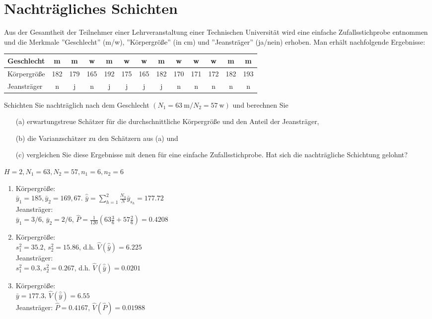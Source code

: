 \documentclass{article}
\begin{document}
\section{Nachträgliches Schichten}
Aus der Gesamtheit der Teilnehmer einer Lehrveranstaltung einer Technischen Universität
wird eine einfache Zufallsstichprobe entnommen und die Merkmale ''Geschlecht'' (m/w),
''Körpergröße'' (in cm) und ''Jeansträger'' (ja/nein) erhoben.
Man erhält nachfolgende Ergebnisse:
\begin{center} \small
	\begin{tabular}{|l|cccccccccccc|} \hline
		Geschlecht   &  m  &  m  &  w  &  m  &  w  &  w  &  m  &  w  &  w  &  w  &  m  &  m  \\ \hline
		Körpergröße  & 182 & 179 & 165 & 192 & 175 & 165 & 182 & 170 & 171 & 172 & 182 & 193 \\
		Jeansträger  &  n  &  j  &  n  &  j  &  j  &  j  &  j  &  n  &  n  &  n  &  n  &  n  \\ \hline
	\end{tabular}
\end{center}
Schichten Sie nachträglich nach dem Geschlecht $(N_1 = 63 \ \text{m} / N_2 = 57 \ \text{w})$
und berechnen Sie
\begin{enumerate}
	\item[(a)] erwartungstreue Schätzer für die durchschnittliche Körpergröße und den Anteil der Jeansträger,
	\item[(b)] die Varianzschätzer zu den Schätzern aus (a) und
	\item[(c)] vergleichen Sie diese Ergebnisse mit denen für eine einfache Zufallsstichprobe. Hat sich die nachträgliche Schichtung gelohnt?
\end{enumerate}
\begin{solution}
$H=2, N_1=63, N_2 = 57, n_1 = 6, n_2 = 6$
\begin{enumerate}
	\item Körpergröße:\\ $\bar{y}_1 = 185, \bar{y}_2 = 169,67$. $\hat{\bar{y}}=\sum_{h=1}^{2}\frac{N_h}{N}\bar{y}_{s_h} = 177.72$\\
	Jeansträger:\\
	$\bar{y}_1=3/6$, $\bar{y}_2=2/6$, $\hat{P}=\frac{1}{120}(63\frac{3}{6}+57\frac{2}{6})=0.4208$
	\item Körpergröße:\\ $s_1^2 = 35.2$, $s_2^2 = 15.86$, d.h. $\hat{V}(\hat{\bar{y}}) = 6.225$\\
	Jeansträger:\\ $s_1^2=0.3, s_2^2=0.267$, d.h. $\hat{V}(\hat{\bar{y}}) = 0.0201$
	\item Körpergröße:\\ $\bar{y}=177.3$, $\hat{V}(\hat{\bar{y}})=6.55$\\
	Jeansträger: $\hat{P}=0.4167$, $\hat{V}(\hat{P})=0.01988$
\end{enumerate}
\end{solution}
\end{document}
